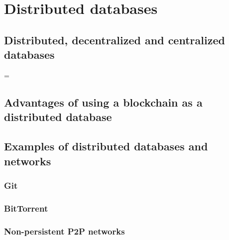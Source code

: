 \section{Distributed databases}

\subsection{Distributed, decentralized and centralized databases}

\iffalse
- to fully comprehend distributed databases, we have to distinguish them from decentralized and centralized databases. baran 1964: in context of networks: distributed vs centralized and decentralized in between
- apply this definition to databases: add examples: one single database: standard example, decentralized: cloudfront CDN by amazon, distributed: bittorrent
\fi

=

\subsection{Advantages of using a blockchain as a distributed database}
\iffalse
- CAP Theorem
 => maybe add a section about database properties in general (CAP theorm) and the blockchain aspect of it (one of the papers mentions this, I think Bitfury)
- general advantages of blockchains as a database: consistency and consensus 
- disadvantages of blockchains: latency and scalability
\fi

\subsection{Examples of distributed databases and networks}


\subsubsection{Git}


\subsubsection{BitTorrent}


\subsubsection{Non-persistent P2P networks}

\iffalse
- no cap applicable, as not a database
- examples: open bazaar.
\fi


